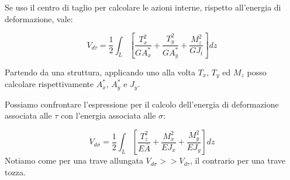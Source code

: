 Se uso il centro di taglio per calcolare le azioni interne, rispetto all'energia di deformazione, vale:

\begin{equation*}
    V_{d\tau}= \frac{1}{2} \int_L 
    \left[
        \frac{T_x^2}{G A^*_x} 
        + \frac{T_y^2}{G A^*_y} 
        + \frac{M_z^2}{G J_t}
    \right] dz
\end{equation*}

Partendo da una struttura, applicando uno alla volta $T_x$, $T_y$ ed $M_z$ posso calcolare rispettivamente $A^*_x$, $A^*_y$ e $J_y$.

Possiamo confrontare l'espressione per il calcolo dell'energia di deformazione associata alle $\tau$ con l'energia associata alle $\sigma$:

\begin{equation*}
    V_{d\sigma}= \frac{1}{2} \int_L 
    \left[
        \frac{T_z^2}{E\bar{A}} 
        + \frac{M_x^2}{E J_x}
        + \frac{M_y^2}{E J_y}
    \right] dz
\end{equation*}
Notiamo come per una trave allungata $V_{d\sigma}>>V_{d\tau}$, il contrario per una trave tozza.
